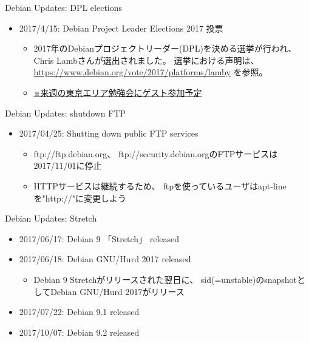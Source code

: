 \documentclass[cjk,c,squeeze,shrink,dvipdfmx,12pt]{beamer}
\begin{document}
\begin{frame}[fragile]{Debian Updates: DPL elections}%
  \begin{itemize}[<+->]
  \item 2017/4/15:  Debian Project Leader Elections 2017 投票
    \begin{itemize}
    \item %
      2017年のDebianプロジェクトリーダー(DPL)を決める選挙が行われ、Chris Lambさんが選出されました。
      選挙における声明は、\url{https://www.debian.org/vote/2017/platforms/lamby} を参照。
    \item%
      \uline{※来週の東京エリア勉強会にゲスト参加予定}
    \end{itemize}
  \end{itemize}
\end{frame}


\begin{frame}[fragile]{Debian Updates: shutdown FTP}%
  \begin{itemize}[<+->]
  \item 2017/04/25:  Shutting down public FTP services
    \begin{itemize}
    \item %
      ftp://ftp.debian.org、
      ftp://security.debian.orgのFTPサービスは 2017/11/01に停止
    \item %
      HTTPサービスは継続するため、
      ftpを使っているユーザはapt-lineを"http://"に変更しよう
    \end{itemize}
  \end{itemize}
\end{frame}

\begin{frame}[fragile]{Debian Updates: Stretch}%
  \begin{itemize}[<+->]
  \item 2017/06/17:  Debian 9 「Stretch」 released
  \item 2017/06/18:  Debian GNU/Hurd 2017 released
    \begin{itemize}
    \item
      Debian 9 Stretchがリリースされた翌日に、
      sid(=unstable)のsnapshotとしてDebian GNU/Hurd 2017がリリース
    \end{itemize}
  \item 2017/07/22:  Debian 9.1 released
  \item 2017/10/07:  Debian 9.2 released
  \end{itemize}
\end{frame}
\end{document}
